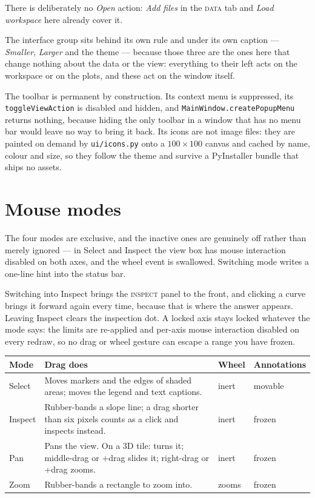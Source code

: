 \documentclass[11pt,a4paper,oneside]{report}
\newcommand{\code}[1]{\texttt{#1}}
\newcommand{\key}[1]{\textsf{\small\fbox{#1}}}
\newcommand{\tab}[1]{\textsc{#1}}
\begin{document}
There is deliberately no \emph{Open} action: \emph{Add files} in the \tab{data}
tab and \emph{Load workspace} here already cover it.

The interface group sits behind its own rule and under its own caption ---
\emph{Smaller}, \emph{Larger} and the theme --- because those three are the
ones here that change nothing about the data or the view: everything to their
left acts on the workspace or on the plots, and these act on the window
itself.

The toolbar is permanent by construction. Its context menu is suppressed, its
\code{toggleViewAction} is disabled and hidden, and
\code{MainWindow.createPopupMenu} returns nothing, because hiding the only
toolbar in a window that has no menu bar would leave no way to bring it back.
Its icons are not image files: they are painted on demand by
\code{ui/icons.py} onto a $100\times100$ canvas and cached by name, colour and
size, so they follow the theme and survive a PyInstaller bundle that ships no
assets.

\section{Mouse modes}

The four modes are exclusive, and the inactive ones are genuinely off rather
than merely ignored --- in Select and Inspect the view box has mouse interaction
disabled on both axes, and the wheel event is swallowed. Switching mode writes a
one-line hint into the status bar.

Switching into Inspect brings the \tab{inspect} panel to the front, and clicking
a curve brings it forward again every time, because that is where the answer
appears. Leaving Inspect clears the inspection dot. A locked axis stays locked
whatever the mode says: the limits are re-applied and per-axis mouse interaction
disabled on every redraw, so no drag or wheel gesture can escape a range you have
frozen.

\begin{center}
\small
\begin{tabular}{@{}p{}p{}p{}p{}@{}}
\toprule
\textbf{Mode} & \textbf{Drag does} & \textbf{Wheel} & \textbf{Annotations} \\
\midrule
Select & Moves markers and the edges of shaded areas; moves the legend and text captions. & inert & movable \\
Inspect & Rubber-bands a slope line; a drag shorter than six pixels counts as a click and inspects instead. & inert & frozen \\
Pan & Pans the view. On a 3D tile: turns it; middle-drag or \key{Shift}+drag slides it; right-drag or \key{Ctrl}+drag zooms. & inert & frozen \\
Zoom & Rubber-bands a rectangle to zoom into. & zooms & frozen \\
\bottomrule
\end{tabular}
\end{center}
\end{document}
